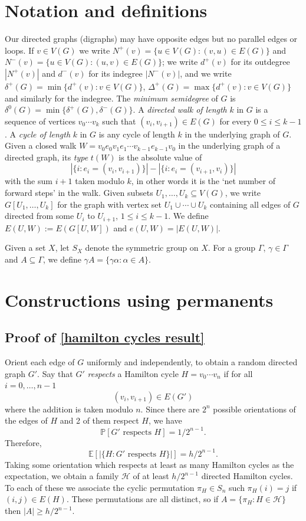 \documentclass[12pt]{article}
\begin{document}
\section{Notation and definitions} \label{Notation}

Our directed graphs (digraphs) may have opposite edges but no parallel edges or loops. If $v\in V(G)$ we write $N^+(v)=\{u\in V(G):(v,u)\in E(G)\}$ and $N^-(v)=\{u\in V(G):(u,v)\in E(G)\}$; we write $d^+(v)$ for its outdegree $|N^+(v)|$ and $d^-(v)$ for its indegree $|N^-(v)|$, and we write $\delta^+(G)=\min\{d^+(v):v\in V(G)\}$, $\Delta^+(G)=\max\{d^+(v):v\in V(G)\}$ and similarly for the indegree. The \textit{minimum semidegree} of $G$ is $\delta^0(G)=\min\{\delta^+(G),\delta^-(G)\}$. A \textit{directed walk of length} $k$ in $G$ is a sequence of vertices $v_0\cdots v_k$ such that $(v_i,v_{i+1})\in E(G)$ for every $0\le i\le k-1$. A \textit{cycle of length} $k$ in $G$ is any cycle of length $k$ in the underlying graph of $G$. Given a closed walk $W=v_0e_0v_1e_1\cdots v_{k-1}e_{k-1}v_0$ in the underlying graph of a directed graph, its \textit{type} $t(W)$ is the absolute value of
$$|\{i:e_i=(v_i,v_{i+1})\}|-|\{i:e_i=(v_{i+1},v_i)\}|$$
with the sum $i+1$ taken modulo $k$, in other words it is the `net number of forward steps' in the walk. Given subsets $U_1,\ldots,U_k\subseteq V(G)$, we write $G[U_1,\ldots,U_k]$ for the graph with vertex set $U_1\cup\cdots\cup U_k$ containing all edges of $G$ directed from some $U_i$ to $U_{i+1}$, $1\le i\le k-1$. We define $E(U,W):=E(G[U,W])$ and $e(U,W)=|E(U,W)|$.

Given a set $X$, let $S_X$ denote the symmetric group on $X$. For a group $\Gamma$, $\gamma\in\Gamma$ and $A\subseteq\Gamma$, we define $\gamma A=\{\gamma\alpha:\alpha\in A\}$.

\section{Constructions using permanents} \label{main section}

\subsection{Proof of \autoref{hamilton cycles result}}
    Orient each edge of $G$ uniformly and independently, to obtain a random directed graph $G'.$ Say that $G'$ \textit{respects} a Hamilton cycle $H=v_0\cdots v_n$ if for all $i=0,\ldots,n-1$
    $$(v_i,v_{i+1})\in E(G')$$
    where the addition is taken modulo $n$. Since there are $2^n$ possible orientations of the edges of $H$ and 2 of them respect $H$, we have
    $$\mathbb P[G'\text{ respects }H]=1/2^{n-1}.$$
    Therefore,
    $$\mathbb E[|\{H:G'\text{ respects }H\}|]=h/2^{n-1}.$$
    Taking some orientation which respects at least as many Hamilton cycles as the expectation, we obtain a family $\mathcal H$ of at least $h/2^{n-1}$ directed Hamilton cycles. To each of these we associate the cyclic permutation $\pi_{H}\in S_n$ such $\pi_{H}(i)=j$ if $(i,j)\in E(H).$ These permutations are all distinct, so if $A=\{\pi_{H}:H\in\mathcal H\}$ then $|A|\ge h/2^{n-1}$.
\end{document}
